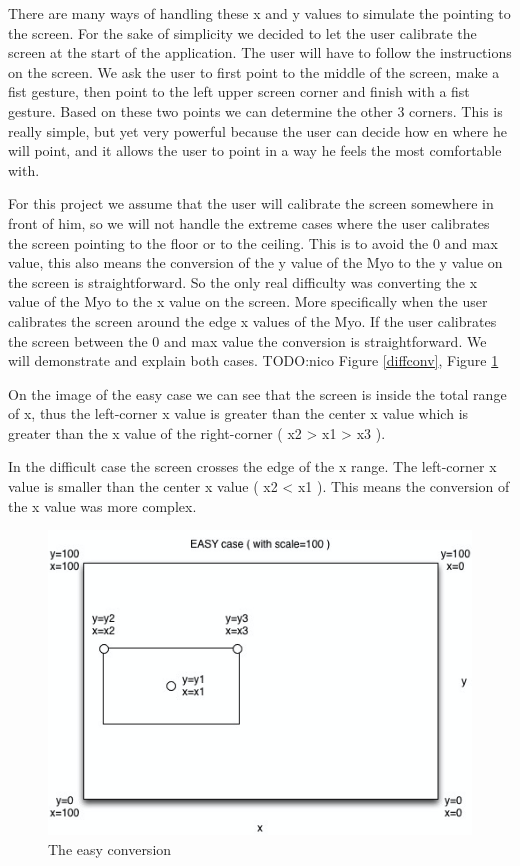 \documentclass{article}
\begin{document}
There are many ways of handling these x and y values to simulate the pointing to the screen. For the sake of simplicity we decided to let the user calibrate the screen at the start of the application. The user will have to follow the instructions on the screen. We ask the user to first point to the middle of the screen, make a fist gesture, then point to the left upper screen corner and finish with a fist gesture. Based on these two points we can determine the other 3 corners.  This is really simple, but yet very powerful because the user can decide how en where he will point, and it allows the user to point in a way he feels the most comfortable with.

For this project we assume that the user will calibrate the screen somewhere in front of him, so we will not handle the extreme cases where the user calibrates the screen pointing to the floor or to the ceiling. This is to avoid the 0 and max value, this also means the conversion of the y value of the Myo to the y value on the screen is straightforward. So the only real difficulty was converting the x value of the Myo to the x value on the screen. More specifically when the user calibrates the screen around the edge x values of the Myo. If the user calibrates the screen between the 0 and max value the conversion is straightforward. We will demonstrate and explain both cases. TODO:nico Figure \ref{diffconv}, Figure \ref{easyconv}

On the image of the easy case we can see that the screen is inside the total range of x, thus the left-corner x value is greater than the center x value which is greater than the x value of the right-corner ( x2 > x1 > x3 ).

In the difficult case the screen crosses the edge of the x range. The left-corner x value is smaller than the center x value ( x2 < x1 ). This means the conversion of the x value was more complex.

\begin{figure}[!ht]
  \centering
      \centerline{\includegraphics[width=1\textwidth]{Images/easy-conversion.png}}
  \caption{The easy conversion}
	\label{easyconv}
\end{figure}
\end{document}
